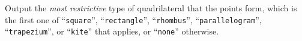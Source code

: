 
    Output the \emph{most restrictive} type of quadrilateral that the points
    form, which is the first one of
    ``\texttt{square}'', ``\texttt{rectangle}'', ``\texttt{rhombus}'',
    ``\texttt{parallelogram}'', ``\texttt{trapezium}'', or ``\texttt{kite}'' that
    applies, or ``\texttt{none}'' otherwise.
